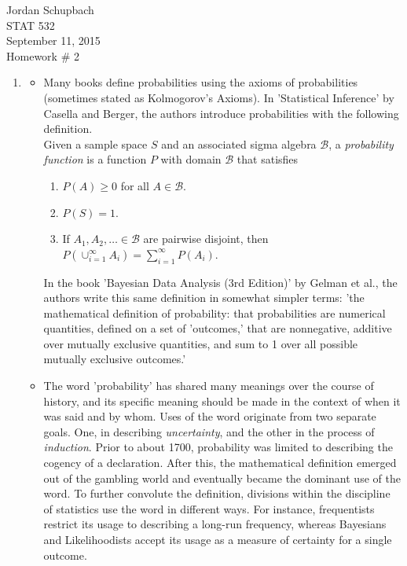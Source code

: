 \documentclass[12pt]{article}\usepackage[]{graphicx}\usepackage[]{color}
\begin{document}
{ \flushright Jordan Schupbach \\
STAT 532\\
September 11, 2015 \\}
Homework \# 2\\

\begin{enumerate}
\item 
\begin{itemize}
\item Many books define probabilities using the axioms of probabilities (sometimes stated as Kolmogorov's Axioms). In 'Statistical Inference' by Casella and Berger, the authors introduce probabilities with the following definition.\\

Given a sample space $S$ and an associated sigma algebra $\mathcal{B}$, a \emph{probability function} is a function $P$ with domain $\mathcal{B}$ that satisfies
\begin{enumerate}[label= {\bf \arabic*. }]
\item $P(A) \geq 0$ for all $A \in \mathcal{B}.$
\item $P(S) = 1.$
\item If $A_1, A_2, \dots \in \mathcal{B}$ are pairwise disjoint, then $P(\cup_{i=1}^{\infty} A_i ) = \sum_{i=1}^{\infty} P(A_i).$
\end{enumerate}
In the book 'Bayesian Data Analysis (3rd Edition)' by Gelman et al., the authors write this same definition in somewhat simpler terms: 'the mathematical definition of probability: that probabilities are numerical quantities, defined on a set of 'outcomes,' that are nonnegative, additive over mutually exclusive quantities, and sum to 1 over all possible mutually exclusive outcomes.'
\item The word 'probability' has shared many meanings over the course of history, and its specific meaning should be made in the context of when it was said and by whom. Uses of the word originate from two separate goals. One, in describing \emph{uncertainty}, and the other in the process of \emph{induction}. Prior to about 1700, probability was limited to describing the cogency of a declaration. After this, the mathematical definition emerged out of the gambling world and eventually became the dominant use of the word. To further convolute the definition, divisions within the discipline of statistics use the word in different ways. For instance, frequentists restrict its usage to describing a long-run frequency, whereas Bayesians and Likelihoodists accept its usage as a measure of certainty for a single outcome.

\end{itemize}
\end{enumerate}
\end{document}

